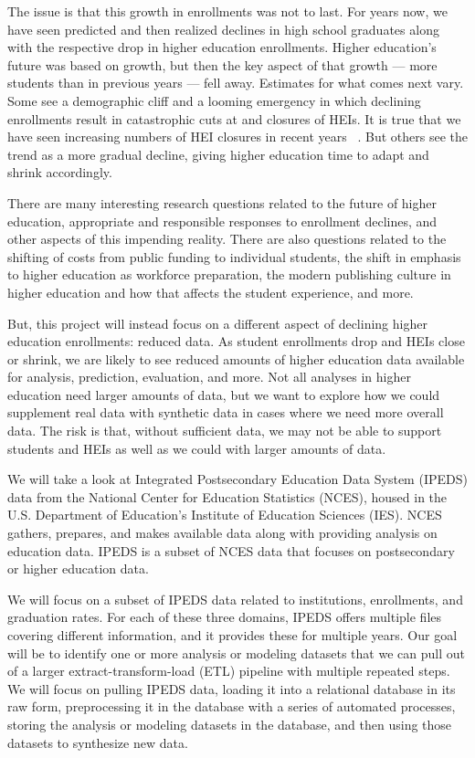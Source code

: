 \documentclass[sigconf, authorversion, nonacm]{acmart}
\begin{document}
    The issue is that this growth in enrollments was not to last. For years now, we have seen predicted and then realized declines in high school graduates along with the respective drop in higher education enrollments. Higher education's future was based on growth, but then the key aspect of that growth --- more students than in previous years --- fell away. Estimates for what comes next vary. Some see a demographic cliff and a looming emergency in which declining enrollments result in catastrophic cuts at and closures of HEIs. It is true that we have seen increasing numbers of HEI closures in recent years ~\cite{hechingercollegeclosures}. But others see the trend as a more gradual decline, giving higher education time to adapt and shrink accordingly. \cite{insidehighereddemographiccliff}

    There are many interesting research questions related to the future of higher education, appropriate and responsible responses to enrollment declines, and other aspects of this impending reality. There are also questions related to the shifting of costs from public funding to individual students, the shift in emphasis to higher education as workforce preparation, the modern publishing culture in higher education and how that affects the student experience, and more.

    But, this project will instead focus on a different aspect of declining higher education enrollments: reduced data. As student enrollments drop and HEIs close or shrink, we are likely to see reduced amounts of higher education data available for analysis, prediction, evaluation, and more. Not all analyses in higher education need larger amounts of data, but we want to explore how we could supplement real data with synthetic data in cases where we need more overall data. The risk is that, without sufficient data, we may not be able to support students and HEIs as well as we could with larger amounts of data.

    We will take a look at Integrated Postsecondary Education Data System (IPEDS) data from the National Center for Education Statistics (NCES), housed in the U.S. Department of Education's Institute of Education Sciences (IES). NCES gathers, prepares, and makes available data along with providing analysis on education data. IPEDS is a subset of NCES data that focuses on postsecondary or higher education data.

    We will focus on a subset of IPEDS data related to institutions, enrollments, and graduation rates. For each of these three domains, IPEDS offers multiple files covering different information, and it provides these for multiple years. Our goal will be to identify one or more analysis or modeling datasets that we can pull out of a larger extract-transform-load (ETL) pipeline with multiple repeated steps. We will focus on pulling IPEDS data, loading it into a relational database in its raw form, preprocessing it in the database with a series of automated processes, storing the analysis or modeling datasets in the database, and then using those datasets to synthesize new data.
\end{document}
